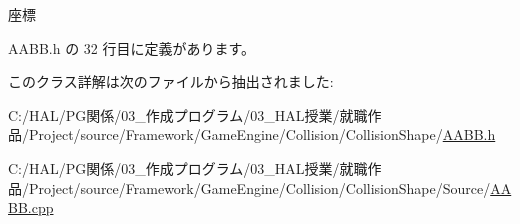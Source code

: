 座標 



 A\+A\+B\+B.\+h の 32 行目に定義があります。



このクラス詳解は次のファイルから抽出されました\+:\begin{DoxyCompactItemize}
\item 
C\+:/\+H\+A\+L/\+P\+G関係/03\+\_\+作成プログラム/03\+\_\+\+H\+A\+L授業/就職作品/\+Project/source/\+Framework/\+Game\+Engine/\+Collision/\+Collision\+Shape/\mbox{\hyperlink{_a_a_b_b_8h}{A\+A\+B\+B.\+h}}\item 
C\+:/\+H\+A\+L/\+P\+G関係/03\+\_\+作成プログラム/03\+\_\+\+H\+A\+L授業/就職作品/\+Project/source/\+Framework/\+Game\+Engine/\+Collision/\+Collision\+Shape/\+Source/\mbox{\hyperlink{_a_a_b_b_8cpp}{A\+A\+B\+B.\+cpp}}\end{DoxyCompactItemize}
